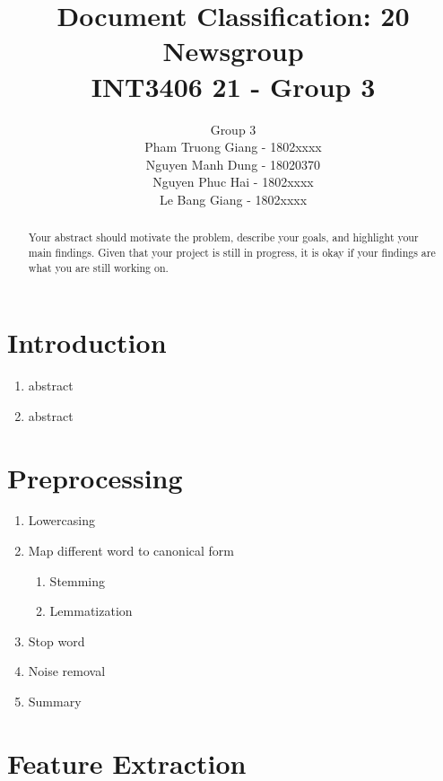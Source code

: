 \documentclass{article}
\title{
  Document Classification: 20 Newsgroup \\
  \vspace{.35cm}
  \Large{\normalfont INT3406 21 - Group 3} 
}
\author{
  \large Group 3\\
  Pham Truong Giang - 1802xxxx\\
  Nguyen Manh Dung - 18020370\\
  Nguyen Phuc Hai - 1802xxxx\\
  Le Bang Giang - 1802xxxx\\
}
\begin{document}
\maketitle

\begin{abstract}
  Your abstract should motivate the problem, describe your goals, 
  and highlight your main findings. Given that your project is still in progress, it is okay if your findings are what you are still working on.
\end{abstract}


\section{Introduction}

\begin{enumerate}[label=1.\arabic*]
    \item abstract
    \item abstract
\end{enumerate}


\section{Preprocessing}

\begin{enumerate}[label=2.\arabic*]
    \item Lowercasing
    \item Map different word to canonical form
    \begin{enumerate}[label=2.2.\arabic*]
        \item Stemming
        \item Lemmatization
    \end{enumerate}
    \item Stop word
    \item Noise removal
    \item Summary
\end{enumerate}



\section{Feature Extraction}
\end{document}
